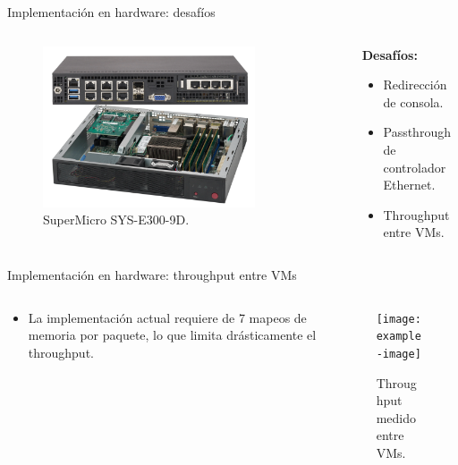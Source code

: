 \documentclass[serif, aspectratio=169]{beamer}
\begin{document}
\begin{frame}{Implementación en hardware: desafíos}
\begin{columns}
    \begin{column}{0.5\textwidth}
        \begin{figure}
            \centering
            \includegraphics[width=0.8\textwidth]{../../Tesis/figs/4_hardware.png}
            \caption{SuperMicro SYS-E300-9D.} 
        \end{figure}
    \end{column}
    \begin{column}{0.4\textwidth}
        \textbf{Desafíos:}
        \begin{itemize}
            \item[\space \textcolor{green}{\checkmark}] Redirección de consola.
            \item[{\color{red}\texttimes}] Passthrough de controlador Ethernet.
            \item[{\color{red}\texttimes}] Throughput entre VMs.
        \end{itemize}
    \end{column}
\end{columns}
\end{frame}

\begin{frame}{Implementación en hardware: throughput entre VMs}
\begin{columns}
    \begin{column}{0.51\textwidth}
    \begin{itemize}
         \item La implementación actual requiere de 7 mapeos de memoria por paquete, lo que limita drásticamente el throughput.
    \end{itemize}

    \end{column}
    \begin{column}{0.50\textwidth}
        \begin{figure}
            \centering
            \texttt{[image: example-image]}
            \caption{Throughput medido entre VMs.}
        \end{figure}
    \end{column}
\end{columns}
\end{frame}
\end{document}
